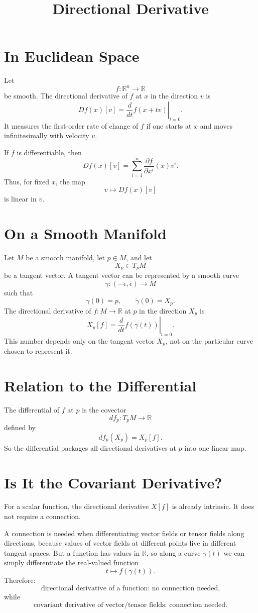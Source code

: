\documentclass[11pt]{article}
\title{Directional Derivative}
\author{}
\date{}
\begin{document}
\maketitle

\section*{In Euclidean Space}

Let
\[
f:\mathbb R^n\to\mathbb R
\]
be smooth. The directional derivative of $f$ at $x$ in the direction $v$ is
\[
Df(x)[v]
=
\left.\frac{d}{dt}f(x+tv)\right|_{t=0}.
\]
It measures the first-order rate of change of $f$ if one starts at $x$ and
moves infinitesimally with velocity $v$.

If $f$ is differentiable, then
\[
Df(x)[v]
=
\sum_{i=1}^n
\frac{\partial f}{\partial x^i}(x)v^i.
\]
Thus, for fixed $x$, the map
\[
v\mapsto Df(x)[v]
\]
is linear in $v$.

\section*{On a Smooth Manifold}

Let $M$ be a smooth manifold, let $p\in M$, and let
\[
X_p\in T_pM
\]
be a tangent vector. A tangent vector can be represented by a smooth curve
\[
\gamma:(-\epsilon,\epsilon)\to M
\]
such that
\[
\gamma(0)=p,
\qquad
\dot\gamma(0)=X_p.
\]
The directional derivative of $f:M\to\mathbb R$ at $p$ in the direction $X_p$
is
\[
X_p[f]
=
\left.\frac{d}{dt}f(\gamma(t))\right|_{t=0}.
\]
This number depends only on the tangent vector $X_p$, not on the particular
curve chosen to represent it.

\section*{Relation to the Differential}

The differential of $f$ at $p$ is the covector
\[
df_p:T_pM\to\mathbb R
\]
defined by
\[
df_p(X_p)=X_p[f].
\]
So the differential packages all directional derivatives at $p$ into one
linear map.

\section*{Is It the Covariant Derivative?}

For a scalar function, the directional derivative $X[f]$ is already intrinsic.
It does not require a connection.

A connection is needed when differentiating vector fields or tensor fields
along directions, because values of vector fields at different points live in
different tangent spaces. But a function has values in $\mathbb R$, so along a
curve $\gamma(t)$ we can simply differentiate the real-valued function
\[
t\mapsto f(\gamma(t)).
\]
Therefore:
\[
\text{directional derivative of a function: no connection needed,}
\]
while
\[
\text{covariant derivative of vector/tensor fields: connection needed.}
\]
\end{document}
